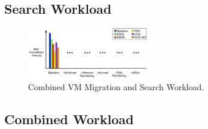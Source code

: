 \subsection{Search Workload}
\label{sec:eval_search}






\newpage\phantom{t}
\begin{figure}[t!!!]
\centering
\includegraphics[width=0.47\textwidth]{figures/eval/map_red}
\caption{Combined VM Migration and Search Workload.}
\label{fig:eval_combined}
\end{figure}

\subsection{Combined Workload}
\label{sec:eval_combined}


